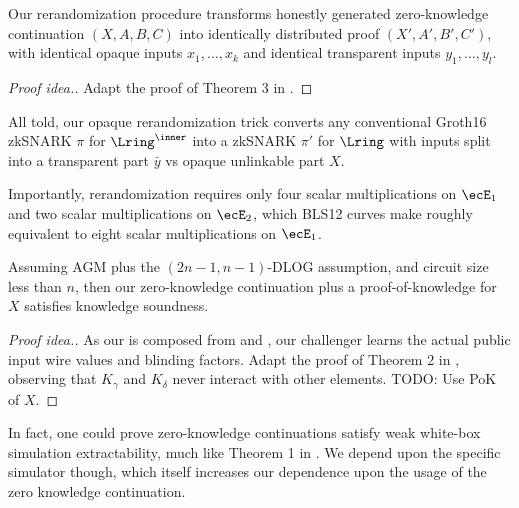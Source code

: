 \begin{lemma}\label{lem:unlinkable}
Our rerandomization procedure %
transforms honestly generated \SpecialG zero-knowledge continuation $(X,A,B,C)$
into identically distributed \SpecialG proof $(X',A',B',C')$,
with identical opaque inputs $x_1,\ldots,x_k$ and
 identical transparent inputs $y_1,\ldots,y_l$.
\end{lemma}

\begin{proof}[Proof idea.]
Adapt the proof of Theorem 3 in \cite[Appendix C, pp. 31]{RandomizationGroth16}.
\end{proof}


All told, our opaque rerandomization trick converts any conventional
Groth16 zkSNARK $\pi$ for $\Lring^\inner$ into a zkSNARK $\pi'$ for $\Lring$
with inputs split into a transparent part $\bar{y}$ vs opaque unlinkable part $X$.

Importantly, rerandomization requires only
 four scalar multiplications on $\ecE_1$ and
 two scalar multiplications on $\ecE_2$,
which  BLS12 curves make roughly equivalent to
 eight scalar multiplications on $\ecE_1$.

\begin{lemma}\label{lem:knowledge_soundness}
Assuming AGM plus the $(2n-1,n-1)$-DLOG assumption, and
 circuit size less than $n$,
then our zero-knowledge continuation \SpecialG plus a proof-of-knowledge for $X$ satisfies knowledge soundness.
\end{lemma}

\begin{proof}[Proof idea.]
As our \Prove is composed from \Preprove and \Reprove, our challenger
learns the actual public input wire values and blinding factors.
Adapt the proof of Theorem 2 in \cite[\S3, pp. 9]{RandomizationGroth16},
observing that $K_\gamma$ and $K_\delta$ never interact with other elements. 
TODO: Use PoK of $X$.
\end{proof}

In fact, one could prove zero-knowledge continuations satisfy
weak white-box simulation extractability,  %
much like Theorem 1 in \cite[\S3, pp. 8 \& 11]{RandomizationGroth16}.
We depend upon the specific simulator though, which itself increases
our dependence upon the usage of the zero knowledge continuation.

